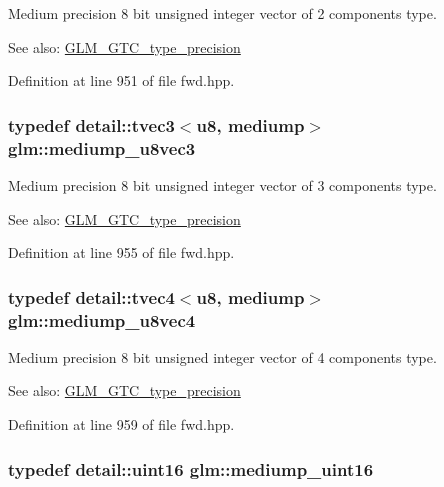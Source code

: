 Medium precision 8 bit unsigned integer vector of 2 components type. \begin{Desc}
\item[See also:]\hyperlink{group__gtc__type__precision}{GLM\_\-GTC\_\-type\_\-precision} \end{Desc}


Definition at line 951 of file fwd.hpp.\hypertarget{group__gtc__type__precision_g58f79eee840b2838443292c50ddb2919}{
\subsubsection[mediump\_\-u8vec3]{\setlength{\rightskip}{0pt plus 5cm}typedef detail::tvec3$<$u8, mediump$>$ {\bf glm::mediump\_\-u8vec3}}}
\label{group__gtc__type__precision_g58f79eee840b2838443292c50ddb2919}


Medium precision 8 bit unsigned integer vector of 3 components type. \begin{Desc}
\item[See also:]\hyperlink{group__gtc__type__precision}{GLM\_\-GTC\_\-type\_\-precision} \end{Desc}


Definition at line 955 of file fwd.hpp.\hypertarget{group__gtc__type__precision_g407b5aa9a3fd6d344b70fa6ce2ce92d4}{
\subsubsection[mediump\_\-u8vec4]{\setlength{\rightskip}{0pt plus 5cm}typedef detail::tvec4$<$u8, mediump$>$ {\bf glm::mediump\_\-u8vec4}}}
\label{group__gtc__type__precision_g407b5aa9a3fd6d344b70fa6ce2ce92d4}


Medium precision 8 bit unsigned integer vector of 4 components type. \begin{Desc}
\item[See also:]\hyperlink{group__gtc__type__precision}{GLM\_\-GTC\_\-type\_\-precision} \end{Desc}


Definition at line 959 of file fwd.hpp.\hypertarget{group__gtc__type__precision_g2cef3a0d7b0fce75c9885f64656d8933}{
\subsubsection[mediump\_\-uint16]{\setlength{\rightskip}{0pt plus 5cm}typedef detail::uint16 {\bf glm::mediump\_\-uint16}}}
\label{group__gtc__type__precision_g2cef3a0d7b0fce75c9885f64656d8933}


